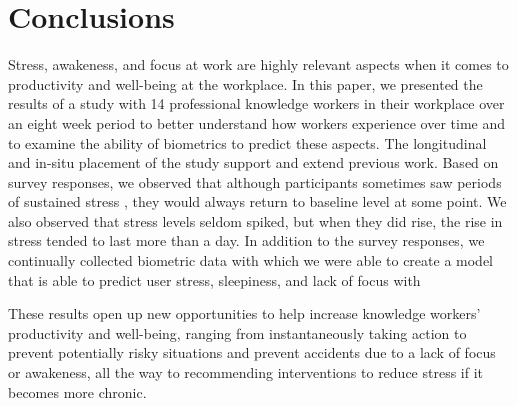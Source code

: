\section{Conclusions} 
Stress, awakeness, and focus at work are highly relevant aspects when
it comes to productivity and well-being at the workplace. In this
paper, we presented the results of a study with 14 professional
knowledge workers in their workplace over an eight week period to
better understand how workers experience  over time and to
examine the ability of biometrics to predict these aspects. The longitudinal and in-situ placement of
the study support and extend previous work. Based on
 survey responses, we observed that
although participants sometimes saw periods of sustained stress ,
they would always return to  baseline  level
at some point. We also observed that stress levels seldom spiked,
but when they did rise, the rise in stress tended to last more
than a day. In addition to the survey responses, we 
continually collected
biometric data with which we were able to create a model that is able to
predict user stress, sleepiness, and lack of focus with 

These results open up new opportunities to help increase knowledge
workers' productivity and well-being, ranging from instantaneously
taking action to prevent potentially risky situations and prevent
accidents due to a lack of focus or awakeness, all the way to
recommending interventions to reduce stress if it becomes more
chronic.


